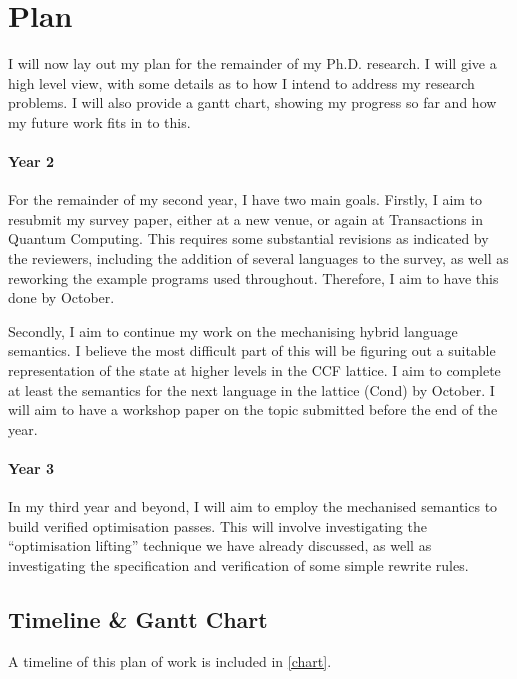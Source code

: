 
\section{Plan} \label{plan}

I will now lay out my plan for the remainder of my Ph.D. research. 
% 
I will give a high level view, with some details as to how I intend to address my research problems. 
% 
I will also provide a gantt chart, showing my progress so far and how my future work fits in to this.


\paragraph{Year 2}
For the remainder of my second year, I  have two main goals.
% 
Firstly, I aim to resubmit my survey paper, either at a new venue, or again at Transactions in Quantum Computing.
% 
This requires some substantial revisions as indicated by the reviewers, including the addition of several languages to the survey,
as well as reworking the example programs used throughout.
% 
Therefore, I aim to have this done by October.


Secondly, I aim to continue my work on the mechanising hybrid language semantics.
% 
I believe the most difficult part of this will be figuring out a suitable representation
of the state at higher levels in the CCF lattice.
% 
I aim to complete at least the semantics for the next language in the lattice (Cond) by October.
% 
I will aim to have a workshop paper on the topic submitted before the end of the year.

\paragraph{Year 3}
In my third year and beyond, I will aim to employ the mechanised semantics to build
verified optimisation passes.
% 
This will involve investigating the ``optimisation lifting'' technique we have already discussed, as well as 
investigating the specification and verification of some simple rewrite rules. 



\subsection{Timeline \& Gantt Chart}



A timeline of this plan of work is included in \cref{chart}.

